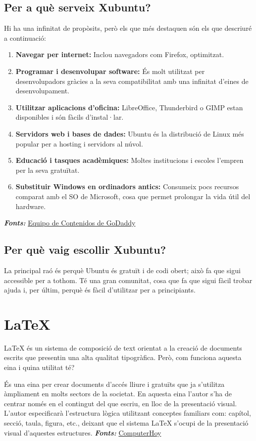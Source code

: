 \subsection{Per a què serveix Xubuntu?}
Hi ha una infinitat de propòsits, però els que més destaquen són els que descriuré a continuació:
\begin{enumerate}
 \item \textbf{Navegar per internet:} Inclou navegadors com Firefox, optimitzat.
 \item \textbf{Programar i desenvolupar software:} És molt utilitzat per desenvolupadors gràcies a la seva compatibilitat amb una infinitat d’eines de desenvolupament.
 \item \textbf{Utilitzar aplicacions d’oficina:} LibreOffice, Thunderbird o GIMP estan disponibles i són fàcils d’instal·lar.
 \item \textbf{Servidors web i bases de dades:} Ubuntu és la distribució de Linux més popular per a hosting i servidors al núvol.
 \item \textbf{Educació i tasques acadèmiques:} Moltes institucions i escoles l’empren per la seva gratuïtat.
 \item \textbf{Substituir Windows en ordinadors antics:} Consumeix pocs recursos comparat amb el SO de Microsoft, cosa que permet prolongar la vida útil del hardware.
\end{enumerate}

\textit{\textbf{Fonts:}} \href{https://www.godaddy.com/resources/es/crearweb/que-es-ubuntu-y-para-que-sirve}{Equipo de Contenidos de GoDaddy}

\subsection{Per què vaig escollir Xubuntu?}
La principal raó és perquè Ubuntu és gratuït i de codi obert; això fa que sigui accessible per a tothom. Té una gran comunitat, cosa que fa que sigui fàcil trobar ajuda i, per últim, perquè és fàcil d’utilitzar per a principiants.

\section{LaTeX} \label{sec:latex}
LaTeX \cite{LaTeX} és un sistema de composició de text orientat a la creació de documents escrits que presentin una alta qualitat tipogràfica. Però, com funciona aquesta eina i quina utilitat té?

És una eina per crear documents d’accés lliure i gratuïts que ja s’utilitza àmpliament en molts sectors de la societat. En aquesta eina l’autor s’ha de centrar només en el contingut del que escriu, en lloc de la presentació visual. L’autor especificarà l’estructura lògica utilitzant conceptes familiars com: capítol, secció, taula, figura, etc., deixant que el sistema LaTeX s’ocupi de la presentació visual d’aquestes estructures.
\textit{\textbf{Fonts:}} \href{https://computerhoy.20minutos.es/tecnologia/latex-como-funciona-util-herramienta-crear-documentos-1165366#3-1670263544507}{ComputerHoy}\\
